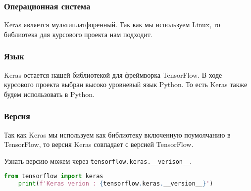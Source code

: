 \subsubsection{Операционная система}
Keras является мультиплатфоренный.
Так как мы используем Linux,
то библиотека для курсового проекта нам подходит.

\subsubsection{Язык}
Keras остается нашей библиотекой для фреймворка TensorFlow.
В ходе курсового проекта выбран высоко уровневый язык Python.
То есть Keras также будем использовать в Python.

\subsubsection{Версия}
Так как Keras мы используем как библиотеку включенную поумолчанию в TensorFlow,
то версия Keras совпадает с версией TensorFlow.

Узнать версию можем через \verb|tensorflow.keras.__verison__|.

\begin{lstlisting}[language=Python,]
    from tensorflow import keras
    print(f'Keras verion : {tensorflow.keras.__version__}')
\end{lstlisting}